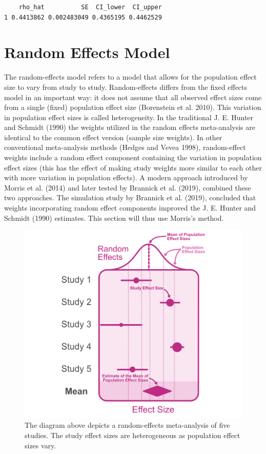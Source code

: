 \documentclass[
  letterpaper,
  DIV=11,
  numbers=noendperiod]{scrreprt}
\begin{document}
\begin{verbatim}
    rho_hat          SE  CI_lower  CI_upper
1 0.4413862 0.002483049 0.4365195 0.4462529
\end{verbatim}

\hypertarget{random-effects-model}{%
\section{Random Effects Model}\label{random-effects-model}}

The random-effects model refers to a model that allows for the
population effect size to vary from study to study. Random-effects
differs from the fixed effects model in an important way: it does not
assume that all observed effect sizes come from a single (fixed)
population effect size (Borenstein et al. 2010). This variation in
population effect sizes is called heterogeneity. In the traditional J.
E. Hunter and Schmidt (1990) the weights utilized in the random effects
meta-analysis are identical to the common effect version (sample size
weights). In other conventional meta-analysis methods (Hedges and Vevea
1998), random-effect weights include a random effect component
containing the variation in population effect sizes (this has the effect
of making study weights more similar to each other with more variation
in population effects). A modern approach introduced by Morris et al.
(2014) and later tested by Brannick et al. (2019), combined these two
approaches. The simulation study by Brannick et al. (2019), concluded
that weights incorporating random effect components improved the J. E.
Hunter and Schmidt (1990) estimates. This section will thus use Morris's
method.

\begin{figure}

{\centering \includegraphics{figure/random_effects_diagram.png}

}

\caption{The diagram above depicts a random-effects meta-analysis of
five studies. The study effect sizes are heterogeneous as population
effect sizes vary.}

\end{figure}
\end{document}

